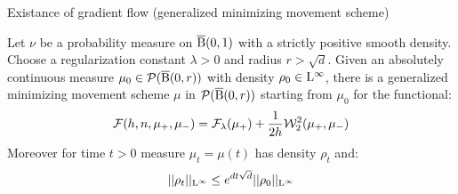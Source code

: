 Existance of gradient flow (generalized minimizing movement scheme)
\begin{thm} \label{thm:existance_gmm_scheme}
Let $\nu$ be a probability measure on $\operatorname{\overline{B}}(0,1)$ with a strictly positive smooth density. Choose a regularization constant $\lambda > 0$ and radius $r > \sqrt{d}$. Given an absolutely continuous measure $\mu_0 \in \mathcal{P}(\operatorname{\overline{B}}(0,r))$ with density $\rho_0 \in \mathrm{L}^{\infty}$, there is a generalized minimizing movement scheme $\mu$ in $\mathcal{P}(\operatorname{\overline{B}}(0,r))$ starting from $\mu_0$ for the functional:
\begin{equation} \label{gmm:sw_ent_functional}
\mathcal{F}(h, n , \mu_+, \mu_-) = \mathcal{F}_{\lambda}(\mu_+) + \frac{1}{2h}{\cal W}_2^2(\mu_+, \mu_-)
\end{equation}
Moreover for time $t > 0$ measure $\mu_t = \mu(t)$ has density $\rho_t$ and:
\[
||\rho_t||_{\mathrm{L}^{\infty}} \leq e^{d t\sqrt{d}} ||\rho_0||_{\mathrm{L}^{\infty}}
\]
\end{thm}
